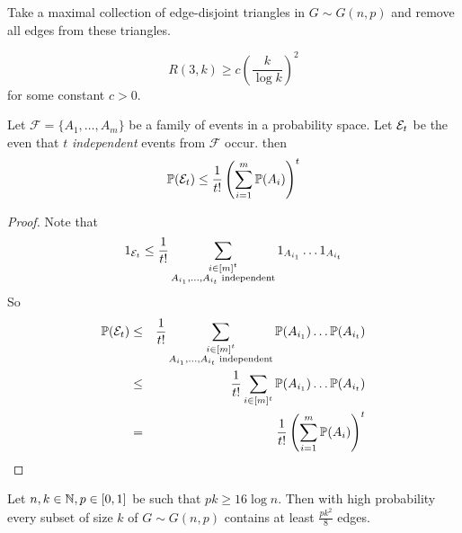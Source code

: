\documentclass{article}
\begin{document}
\begin{idea}
  Take a maximal collection of edge-disjoint triangles in $G \sim G(n, p)$ and remove all edges from these triangles.
\end{idea}

\begin{thm}[Erd\H os]
  $$R(3, k) \ge c\left(\frac k{\log k}\right)^2$$
  for some constant $c > 0$.
\end{thm}

\begin{lemma}
  Let $\mathcal F = \{A_1, \dots, A_m\}$ be a family of events in a probability space. Let $\mathcal E_t$ be the even that $t$ {\it independent} events from $\mathcal F$ occur. then
  $$\mathbb P(\mathcal E_t) \le \frac 1{t!}\left(\sum_{i = 1}^m \mathbb P(A_i)\right)^t$$
\end{lemma}
\begin{proof}
  Note that
  $$1_{\mathcal E_t} \le \frac 1{t!} \sum_{\substack{i \in [m]^t \\ A_{i_1}, \dots, A_{i_t}\text{ independent}}} 1_{A_{i_1}} \dots 1_{A_{i_t}}$$
  So
  \begin{eqnarray*}
    \mathbb P(\mathcal E_t)
    & \le & \frac 1{t!} \sum_{\substack{i \in [m]^t \\ A_{i_1}, \dots, A_{i_t}\text{ independent}}} \mathbb P(A_{i_1}) \dots \mathbb P(A_{i_t}) \\
    & \le & \frac 1{t!} \sum_{i \in [m]^t} \mathbb P(A_{i_1}) \dots \mathbb P(A_{i_t}) \\
    & = & \frac 1{t!} \left(\sum_{i = 1}^m \mathbb P(A_i)\right)^t
  \end{eqnarray*}
\end{proof}

\newlec

\begin{lemma}
  Let $n, k \in \mathbb N, p \in [0, 1]$ be such that $pk \ge 16\log n$. Then with high probability every subset of size $k$ of $G \sim G(n, p)$ contains at least $\frac{pk^2}8$ edges.
\end{lemma}
\end{document}
